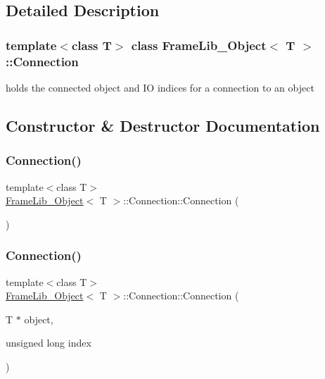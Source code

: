 \subsection{Detailed Description}
\subsubsection*{template$<$class T$>$\newline
class Frame\+Lib\+\_\+\+Object$<$ T $>$\+::\+Connection}

holds the connected object and IO indices for a connection to an object 

\subsection{Constructor \& Destructor Documentation}
\mbox{\label{struct_frame_lib___object_1_1_connection_ab0e9711193a05fc2f5db06354d7a888f}} 
\subsubsection{\texorpdfstring{Connection()}{Connection()}\hspace{0.1cm}{\footnotesize\ttfamily [1/2]}}
{\footnotesize\ttfamily template$<$class T$>$ \\
\hyperlink{class_frame_lib___object}{Frame\+Lib\+\_\+\+Object}$<$ T $>$\+::Connection\+::\+Connection (\begin{DoxyParamCaption}{ }\end{DoxyParamCaption})\hspace{0.3cm}{\ttfamily [inline]}}

\mbox{\label{struct_frame_lib___object_1_1_connection_adcdad42d336b5d8861c63a6389fa4695}} 
\subsubsection{\texorpdfstring{Connection()}{Connection()}\hspace{0.1cm}{\footnotesize\ttfamily [2/2]}}
{\footnotesize\ttfamily template$<$class T$>$ \\
\hyperlink{class_frame_lib___object}{Frame\+Lib\+\_\+\+Object}$<$ T $>$\+::Connection\+::\+Connection (\begin{DoxyParamCaption}\item[{T $\ast$}]{object,  }\item[{unsigned long}]{index }\end{DoxyParamCaption})\hspace{0.3cm}{\ttfamily [inline]}}



